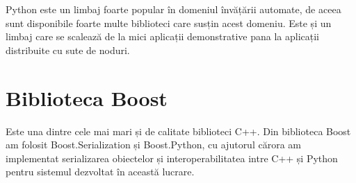 Python este un limbaj foarte popular în domeniul învățării automate, de aceea sunt disponibile foarte multe biblioteci care susțin acest domeniu.
Este și un limbaj care se scalează de la mici aplicații demonstrative pana la aplicații distribuite cu sute de noduri.












\section{Biblioteca Boost}

Este una dintre cele mai mari și de calitate biblioteci C++.
Din biblioteca Boost am folosit Boost.Serialization și Boost.Python, cu ajutorul cărora am implementat serializarea obiectelor și interoperabilitatea intre C++ și Python pentru sistemul dezvoltat în această lucrare.


